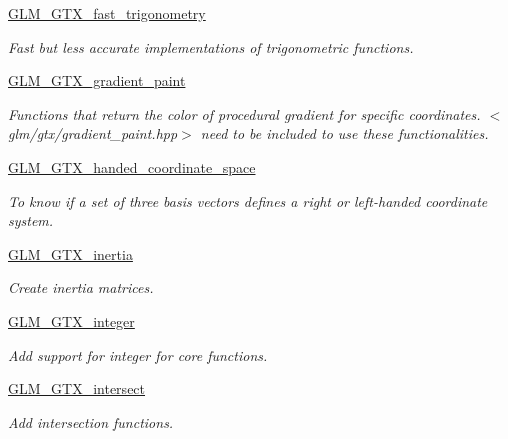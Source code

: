 \begin{CompactItemize}
\item 
\hyperlink{group__gtx__fast__trigonometry}{GLM\_\-GTX\_\-fast\_\-trigonometry}
\begin{CompactList}\small\item\em Fast but less accurate implementations of trigonometric functions. \item\end{CompactList}

\item 
\hyperlink{group__gtx__gradient__paint}{GLM\_\-GTX\_\-gradient\_\-paint}
\begin{CompactList}\small\item\em Functions that return the color of procedural gradient for specific coordinates. $<$glm/gtx/gradient\_\-paint.hpp$>$ need to be included to use these functionalities. \item\end{CompactList}

\item 
\hyperlink{group__gtx__handed__coordinate__space}{GLM\_\-GTX\_\-handed\_\-coordinate\_\-space}
\begin{CompactList}\small\item\em To know if a set of three basis vectors defines a right or left-handed coordinate system. \item\end{CompactList}

\item 
\hyperlink{group__gtx__inertia}{GLM\_\-GTX\_\-inertia}
\begin{CompactList}\small\item\em Create inertia matrices. \item\end{CompactList}

\item 
\hyperlink{group__gtx__integer}{GLM\_\-GTX\_\-integer}
\begin{CompactList}\small\item\em Add support for integer for core functions. \item\end{CompactList}

\item 
\hyperlink{group__gtx__intersect}{GLM\_\-GTX\_\-intersect}
\begin{CompactList}\small\item\em Add intersection functions. \item\end{CompactList}


\end{CompactItemize}
